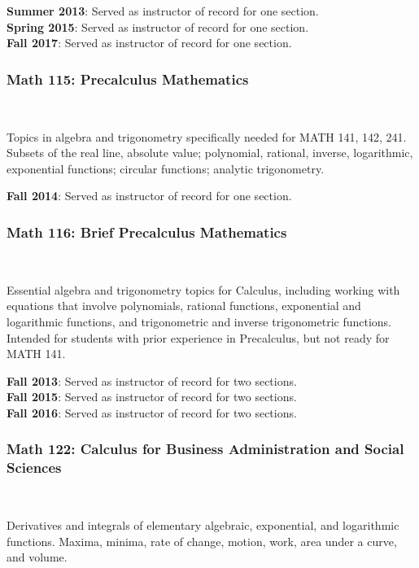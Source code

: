 \documentclass[teaching.portfolio.tex]{subfiles}
\begin{document}
\noindent
\textbf{Summer 2013}: Served as instructor of record for one section.\\
\textbf{Spring 2015}: Served as instructor of record for one section.\\
\textbf{Fall 2017}: Served as instructor of record for one section.

\subsubsection{Math 115: Precalculus Mathematics}\hfill\\
\begin{tcolorbox}
  \begin{desc}
    Topics in algebra and trigonometry specifically needed for MATH 141, 142, 241. Subsets of the real line, absolute value; polynomial, rational, inverse, logarithmic, exponential functions; circular functions; analytic trigonometry.
  \end{desc}
\end{tcolorbox}

\noindent
\textbf{Fall 2014}: Served as instructor of record for one section.

\subsubsection{Math 116: Brief Precalculus Mathematics}\hfill\\
\begin{tcolorbox}
  \begin{desc}
    Essential algebra and trigonometry topics for Calculus, including working with equations that involve polynomials, rational functions, exponential and logarithmic functions, and trigonometric and inverse trigonometric functions. Intended for students with prior experience in Precalculus, but not ready for MATH 141.
  \end{desc}
\end{tcolorbox}

\noindent
\textbf{Fall 2013}: Served as instructor of record for two sections.\\
\textbf{Fall 2015}: Served as instructor of record for two sections.\\
\textbf{Fall 2016}: Served as instructor of record for two sections.

\subsubsection{Math 122: Calculus for Business Administration and Social Sciences}\hfill\\
\begin{tcolorbox}
  \begin{desc}
    Derivatives and integrals of elementary algebraic, exponential, and logarithmic functions. Maxima, minima, rate of change, motion, work, area under a curve, and volume.
  \end{desc}
\end{tcolorbox}
\end{document}

